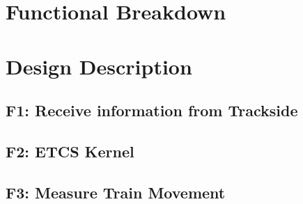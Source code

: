 \documentclass{template/openetcs_report}
\begin{document}
\chapter{Functional Breakdown}


\chapter{Design Description}

\section{F1: Receive information from Trackside}
\section{F2: ETCS Kernel}









\section{F3: Measure Train Movement}
\end{document}

